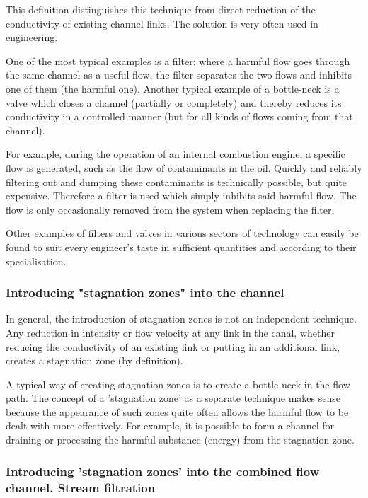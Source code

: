 \documentclass[a4paper,11pt]{article}
\begin{document}
This definition distinguishes this technique from direct reduction of the
conductivity of existing channel links. The solution is very often used in
engineering.

One of the most typical examples is a filter: where a harmful flow goes
through the same channel as a useful flow, the filter separates the two flows
and inhibits one of them (the harmful one). Another typical example of a
bottle-neck is a valve which closes a channel (partially or completely) and
thereby reduces its conductivity in a controlled manner (but for all kinds of
flows coming from that channel).

For example, during the operation of an internal combustion engine, a specific
flow is generated, such as the flow of contaminants in the oil. Quickly and
reliably filtering out and dumping these contaminants is technically possible,
but quite expensive. Therefore a filter is used which simply inhibits said
harmful flow. The flow is only occasionally removed from the system when
replacing the filter.

Other examples of filters and valves in various sectors of technology can
easily be found to suit every engineer's taste in sufficient quantities and
according to their specialisation.

\subsubsection{Introducing "stagnation zones" into the channel}

In general, the introduction of stagnation zones is not an independent
technique. Any reduction in intensity or flow velocity at any link in the
canal, whether reducing the conductivity of an existing link or putting in an
additional link, creates a stagnation zone (by definition).

A typical way of creating stagnation zones is to create a bottle neck in the
flow path. The concept of a 'stagnation zone' as a separate technique makes
sense because the appearance of such zones quite often allows the harmful flow
to be dealt with more effectively. For example, it is possible to form a
channel for draining or processing the harmful substance (energy) from the
stagnation zone.

\subsubsection{Introducing 'stagnation zones' into the combined flow channel.
  Stream filtration}
\end{document}
